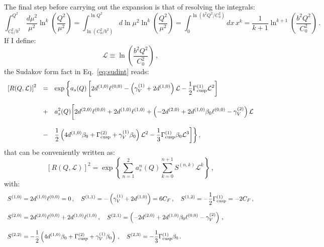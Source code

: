 \documentclass[10pt,a4paper]{article}
\begin{document}
The final step before carrying out the expansion is that of resolving
the integrals:
\begin{equation}
\int_{C_0^2/b^2}^{Q^2}\frac{d\mu^2}{\mu^2}\ln^k\left(\frac{Q^2}{\mu^2}\right)
= \int_{\ln(C_0^2/b^2)}^{\ln
  Q^2}d\ln\mu^2\ln^k\left(\frac{Q^2}{\mu^2}\right) = \int^{\ln(b^2Q^2/C_0^2)}_{0}dx\,x^k=\frac{1}{k+1}\ln^{k+1}\left(\frac{b^2Q^2}{C_0^2}\right)\,.
\end{equation}
If I define:
\begin{equation}
\mathcal{L}\equiv \ln\left(\frac{b^2Q^2}{C_0^2}\right)\,,
\end{equation}
the Sudakov form fact in Eq.~\ref{eq:sudint} reads:
\begin{equation}
\begin{array}{rcl}
  \displaystyle \left[R(Q,\mathcal{L})\right]^2&=&\displaystyle \exp\bigg\{a_s(Q)\left[2d^{(1,0)}\ell^{(0,0)}-\left(\gamma_V^{(1)}+2d^{(1,0)}\right)\mathcal{L}-\frac{1}{2}\Gamma_{\rm
                                         cusp}^{(1)}\mathcal{L}^2\right]\\
  \\
                                     &+&\displaystyle a_s^2(Q) \bigg[2d^{(2,0)}\ell^{(0,0)} +
                                         2d^{(1,0)}\ell^{(1,0)}+\left(-2d^{(2,0)}+2d^{(1,0)}\beta_0
                                         \ell^{(0,0)}-\gamma_V^{(2)}\right)\mathcal{L}\\
  \\
                                     &-&\displaystyle \frac12\left(4d^{(1,0)}\beta_0+\Gamma_{\rm
                                         cusp}^{(2)}+\gamma_V^{(1)}\beta_0 \right) \mathcal{L}^2-\frac13\Gamma_{\rm
                                         cusp}^{(1)}\beta_0 \mathcal{L}^3\bigg]\bigg\}\,,
\end{array}
\end{equation}
that can be conveniently written as:
\begin{equation}\label{eq:SudCompact}
  \displaystyle \left[R(Q,\mathcal{L})\right]^2=\exp\left\{\sum_{n=1}^2a_s^n(Q)\sum_{k=0}^{n+1}S^{(n,k)}\mathcal{L}^k\right\}\,,
\end{equation}
with:
\begin{equation}
\begin{array}{l}
\displaystyle S^{(1,0)} =
  2d^{(1,0)}\ell^{(0,0)}=0\,,\quad\displaystyle S^{(1,1)} =
  -\left(\gamma_V^{(1)}+2d^{(1,0)}\right)=6 C_F\,,\quad\displaystyle
                                                   S^{(1,2)} =
  -\frac{1}{2}\Gamma_{\rm cusp}^{(1)}= -2C_F\,,\\
\\
\displaystyle S^{(2,0)} = 2d^{(2,0)}\ell^{(0,0)} +
  2d^{(1,0)}\ell^{(1,0)}\,,\quad\displaystyle S^{(2,1)} =
                           \left(-2d^{(2,0)}+2d^{(1,0)}\beta_0
  \ell^{(0,0)}-\gamma_V^{(2)}\right)\,,\\
\\
\displaystyle S^{(2,2)} = -\frac12\left(4d^{(1,0)}\beta_0+\Gamma_{\rm cusp}^{(2)}+\gamma_V^{(1)}\beta_0 \right)\,,\quad\displaystyle S^{(2,3)} = -\frac13\Gamma_{\rm cusp}^{(1)}\beta_0\,.
\end{array}
\end{equation}
\end{document}

